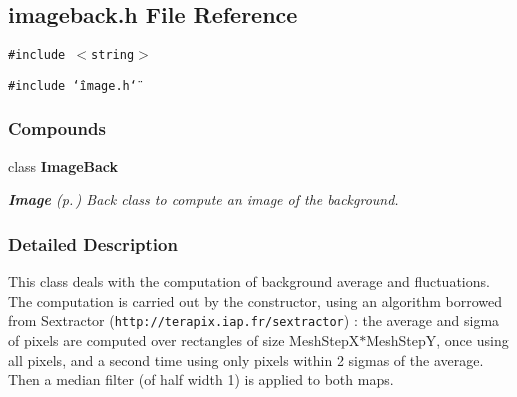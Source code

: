 \subsection{imageback.h File Reference}
\label{imageback_h}
{\tt \#include $<$string$>$}\par
{\tt \#include \char`\"{}image.h\char`\"{}}\par
\subsubsection*{Compounds}
\begin{CompactItemize}
\item 
class {\bf Image\-Back}
\begin{CompactList}\small\item\em {\bf Image} {\rm (p.\,\pageref{class_image})} Back class to compute an image of the background.\item\end{CompactList}\end{CompactItemize}


\subsubsection{Detailed Description}
 This class deals with the computation of background average and fluctuations. The computation is carried out by the constructor, using an algorithm borrowed from Sextractor ({\tt http://terapix.iap.fr/sextractor}) : the average and sigma of pixels are computed over rectangles of size Mesh\-Step\-X$\ast$Mesh\-Step\-Y, once using all pixels, and a second time using only pixels within 2 sigmas of the average. Then a median filter (of half width 1) is applied to both maps.

